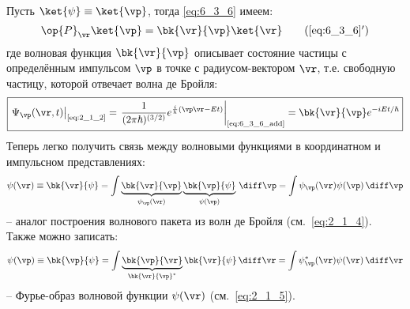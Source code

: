 Пусть $\ket{\psi}\equiv\ket{\vp}$, тогда \eqref{eq:6_3_6} имеем:
\begin{equation}
\label{eq:6_3_6_add}
\op{P}_{\vr}\ket{\vp}=\bk{\vr}{\vp}\ket{\vr}
\tag{\ref{eq:6_3_6}$'$}
\end{equation}%
%
где волновая функция $\bk{\vr}{\vp}$ описывает состояние частицы с определённым импульсом $\vp$ в точке с радиусом-вектором $\vr$, т.е. свободную частицу, которой отвечает волна де Бройля:%
%
\begin{equation}
\label{eq:6_3_9}
\boxed{
	\left. \Psi_{\vp}(\vr,t) \right|_{\text{\eqref{eq:2_1_2}}} = 
	\left. \frac{1}{(2\pi \hbar)^{(3/2)}} e^{\frac{i}{h} (\vp\vr-Et)}  \right|_{\text{\eqref{eq:6_3_6_add}}} = 
	\bk{\vr}{\vp} e^{-iEt/\hbar}
}
\end{equation}%
%
Теперь легко получить связь между волновыми функциями в координатном и импульсном представлениях:%
%
\begin{equation}
\label{eq:6_3_10}
\psi(\vr) \equiv \bk{\vr}{\psi} = 
\int \underbrace{  \bk{\vr}{\vp}  }_ {\psi_{\vp}(\vr)}  \underbrace{ \bk{\vp}{\psi} }_{\psi(\vp)} \, \diff\vp =
\int \psi_{\vp}(\vr) \psi(\vp) \, \diff\vp
\end{equation}%
-- аналог построения волнового пакета из волн де Бройля (см.~\eqref{eq:2_1_4}). Также можно записать:%
%
\begin{equation}
\label{eq:6_3_11}
\psi(\vp) \equiv \bk{\vp}{\psi} = 
\int \underbrace{  \bk{\vp}{\vr}  }_ {\bk{\vr}{\vp}^*} \bk{\vr}{\psi} \, \diff\vr =
\int \psi^*_{\vp}(\vr) \psi(\vr) \, \diff\vr
\end{equation}%
-- Фурье-образ волновой функции $\psi(\vr)$ (см.~\eqref{eq:2_1_5}). 

